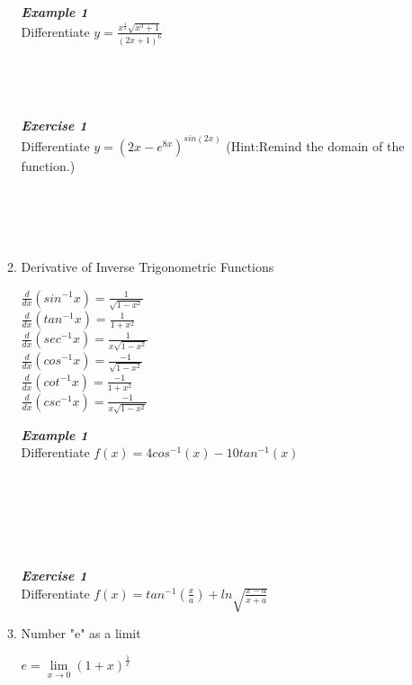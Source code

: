 \documentclass[12px]{article}
\begin{document}
\begin{enumerate}
\begin{enumerate}[(1)]
        \newpage
        \textbf{\textit{Example 1}}\\
        Differentiate $y=\frac{x^{\frac{1}{3}}\sqrt{x^3+1}}{(2x+1)^6}$\\
        \\
        \\
        \\
        \\
        \textbf{\textit{Exercise 1}}\\
        Differentiate $y=(2x-e^{8x})^{sin(2x)}$ (Hint:Remind the domain of the function.)\\
        \\
        \\
        \\
        \\
        \item Derivative of Inverse Trigonometric Functions
        \begin{multicols}{2}
            $\frac{d}{dx}(sin^{-1}x)=\frac{1}{\sqrt{1-x^2}}$\\
            $\frac{d}{dx}(tan^{-1}x)=\frac{1}{1+x^2}$\\
            $\frac{d}{dx}(sec^{-1}x)=\frac{1}{x\sqrt{1-x^2}}$\\
            $\frac{d}{dx}(cos^{-1}x)=\frac{-1}{\sqrt{1-x^2}}$\\
            $\frac{d}{dx}(cot^{-1}x)=\frac{-1}{1+x^2}$\\
            $\frac{d}{dx}(csc^{-1}x)=\frac{-1}{x\sqrt{1-x^2}}$
        \end{multicols}
        \textbf{\textit{Example 1}}\\
        Differentiate $f(x)=4cos^{-1}(x)-10tan^{-1}(x)$\\
        \\
        \\
        \\
        \\
        \\
        \\
        \textbf{\textit{Exercise 1}}\\
        Differentiate $f(x)=tan^{-1}(\frac{x}{a})+ln\sqrt{\frac{x-a}{x+a}}$\\
        \newpage
        \item Number "e" as a limit\\
        \begin{center}
            $e=\lim\limits_{x\to0}(1+x)^{\frac{1}{x}}$\\

\end{center}
\end{enumerate}
\end{enumerate}
\end{document}
